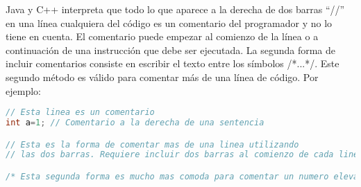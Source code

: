 Java y C++ interpreta que todo lo que aparece a la derecha de dos barras “//” en una línea cualquiera
del código es un comentario del programador y no lo tiene en cuenta. El comentario puede empezar
al comienzo de la línea o a continuación de una instrucción que debe ser ejecutada. La segunda
forma de incluir comentarios consiste en escribir el texto entre los símbolos /*...*/. Este segundo
método es válido para comentar más de una línea de código. Por ejemplo:

\begin{lstlisting}[language=C++]
// Esta linea es un comentario
int a=1; // Comentario a la derecha de una sentencia

// Esta es la forma de comentar mas de una linea utilizando
// las dos barras. Requiere incluir dos barras al comienzo de cada linea

/* Esta segunda forma es mucho mas comoda para comentar un numero elevado de lineas ya que solo requiere modificar el comienzo y el final. */
\end{lstlisting}